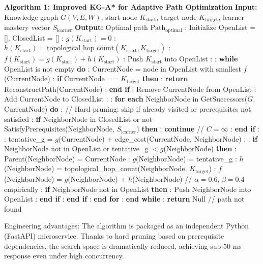 \documentclass{ieeeaccess}
\begin{document}
\begin{algorithmic}
\STATE \textbf{Algorithm 1: Improved KG-A* for Adaptive Path Optimization}
\STATE \textbf{Input:} Knowledge graph $G(V,E,W)$, start node $K_{\text{start}}$, target node $K_{\text{target}}$, learner mastery vector $S_{\text{learner}}$
\STATE \textbf{Output:} Optimal path $\text{Path}_{\text{optimal}}$
\STATE 
{}: Initialize OpenList = [], ClosedList = []
: $g(K_{\text{start}}) = 0$
: $h(K_{\text{start}}) = \text{topological\_hop\_count}(K_{\text{start}}, K_{\text{target}})$
: $f(K_{\text{start}}) = g(K_{\text{start}}) + h(K_{\text{start}})$
: Push $K_{\text{start}}$ into OpenList
: 
: \textbf{while} OpenList is not empty \textbf{do}
: \quad CurrentNode = node in OpenList with smallest $f$(CurrentNode)
: \quad \textbf{if} CurrentNode == $K_{\text{target}}$ \textbf{then}
: \quad \quad \textbf{return} ReconstructPath(CurrentNode)
: \quad \textbf{end if}
: \quad Remove CurrentNode from OpenList
: \quad Add CurrentNode to ClosedList
: 
: \quad \textbf{for each} NeighborNode in GetSuccessors($G$, CurrentNode) \textbf{do}
: \quad \quad // Hard pruning: skip if already visited or prerequisites not satisfied
: \quad \quad \textbf{if} NeighborNode in ClosedList or not SatisfyPrerequisites(NeighborNode, $S_{\text{learner}}$) \textbf{then}
: \quad \quad \quad \textbf{continue}  // $C = \infty$
: \quad \quad \textbf{end if}
: 
: \quad \quad tentative\_g = $g$(CurrentNode) + edge\_cost(CurrentNode, NeighborNode)
: 
: \quad \quad \textbf{if} NeighborNode not in OpenList or tentative\_g $< g$(NeighborNode) \textbf{then}
: \quad \quad \quad Parent(NeighborNode) = CurrentNode
: \quad \quad \quad $g$(NeighborNode) = tentative\_g
: \quad \quad \quad $h$(NeighborNode) = topological\_hop\_count(NeighborNode, $K_{\text{target}}$)
: \quad \quad \quad $f$(NeighborNode) = $g$(NeighborNode) + $h$(NeighborNode)  // $\alpha=0.6$, $\beta=0.4$ empirically
: \quad \quad \quad \textbf{if} NeighborNode not in OpenList \textbf{then}
: \quad \quad \quad \quad Push NeighborNode into OpenList
: \quad \quad \quad \textbf{end if}
: \quad \quad \textbf{end if}
: \quad \textbf{end for}
: \textbf{end while}
: \textbf{return} Null  // path not found
\end{algorithmic}

Engineering advantages: The algorithm is packaged as an independent Python (FastAPI) microservice. Thanks to hard pruning based on prerequisite dependencies, the search space is dramatically reduced, achieving sub-50 ms response even under high concurrency.
\end{document}
